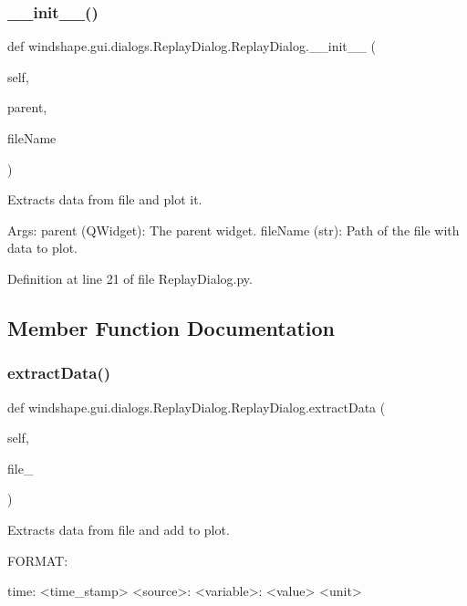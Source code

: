 \subsubsection{\texorpdfstring{\+\_\+\+\_\+init\+\_\+\+\_\+()}{\_\_init\_\_()}}
{\footnotesize\ttfamily def windshape.\+gui.\+dialogs.\+Replay\+Dialog.\+Replay\+Dialog.\+\_\+\+\_\+init\+\_\+\+\_\+ (\begin{DoxyParamCaption}\item[{}]{self,  }\item[{}]{parent,  }\item[{}]{file\+Name }\end{DoxyParamCaption})}

\begin{DoxyVerb}Extracts data from file and plot it.

Args:
    parent (QWidget): The parent widget.
    fileName (str): Path of the file with data to plot.
\end{DoxyVerb}
 

Definition at line 21 of file Replay\+Dialog.\+py.



\subsection{Member Function Documentation}
\mbox{\label{classwindshape_1_1gui_1_1dialogs_1_1_replay_dialog_1_1_replay_dialog_ad8259d3892a7652ecae975b973e73294}} 
\subsubsection{\texorpdfstring{extract\+Data()}{extractData()}}
{\footnotesize\ttfamily def windshape.\+gui.\+dialogs.\+Replay\+Dialog.\+Replay\+Dialog.\+extract\+Data (\begin{DoxyParamCaption}\item[{}]{self,  }\item[{}]{file\+\_\+ }\end{DoxyParamCaption})}

\begin{DoxyVerb}Extracts data from file and add to plot.

FORMAT:

time: <time_stamp>
    <source>:
<variable>: <value> <unit>
\end{DoxyVerb}
 

